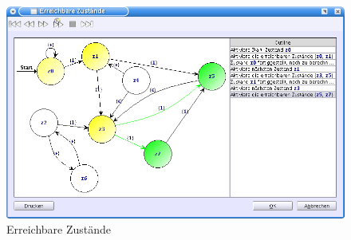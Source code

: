 \begin{figure}[h!]
\begin{center}
\includegraphics[width=12cm]{../images/reachable_states.png}
\caption{Erreichbare Zustände}
\label{FigureReachableStates}
\end{center}
\end{figure}
\vspace{10pt}


